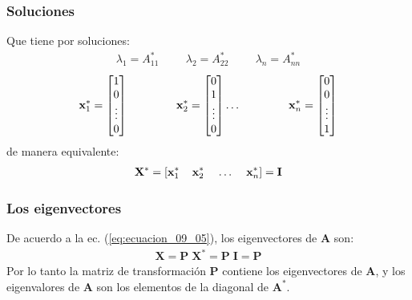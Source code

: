 \documentclass[12pt]{beamer}
\begin{document}
\begin{frame}
\frametitle{Soluciones}
Que tiene por soluciones:
\pause
\begin{align}
\lambda_{1} = A_{11}^{*} \hspace{1cm} \lambda_{2} = A_{22}^{*} \hspace{1cm} \lambda_{n} = A_{nn}^{*}
\label{eq:ecuacion_09_07}
\end{align}
\renewcommand{\arraystretch}{0.85}
\begin{align}
\mathbf{x}_{1}^{*} =
\begin{bmatrix}
1 \\
0 \\
\vdots \\
0
\end{bmatrix} \hspace{1.5cm}
\mathbf{x}_{2}^{*} =
\begin{bmatrix}
0 \\
1 \\
\vdots \\
0
\end{bmatrix} \ldots \hspace{1.5cm}
\mathbf{x}_{n}^{*} =
\begin{bmatrix}
0 \\
0 \\
\vdots \\
1
\end{bmatrix}
\end{align}
\pause
de manera equivalente:
\pause
\begin{align*}
\mathbf{X^{*}} = \left[ \mathbf{x}_{1}^{*} \hspace{0.4cm} \mathbf{x}_{2}^{*} \hspace{0.4cm} \ldots \hspace{0.4cm} \mathbf{x}_{n}^{*} \right] = \mathbf{I}
\end{align*}
\end{frame}
\begin{frame}
\frametitle{Los eigenvectores}
De acuerdo a la ec. (\ref{eq:ecuacion_09_05}), los eigenvectores de $\mathbf{A}$ son:
\pause
\begin{align}
\mathbf{X} = \mathbf{P \; X}^{*} = \mathbf{P \; I} = \mathbf{P}
\label{eq:ecuacion_09_08}
\end{align}
\pause
Por lo tanto la matriz de transformación $\mathbf{P}$ contiene los eigenvectores de $\mathbf{A}$, y los eigenvalores de $\mathbf{A}$ son los elementos de la diagonal de $\mathbf{A}^{*}$.
\end{frame}
\end{document}
